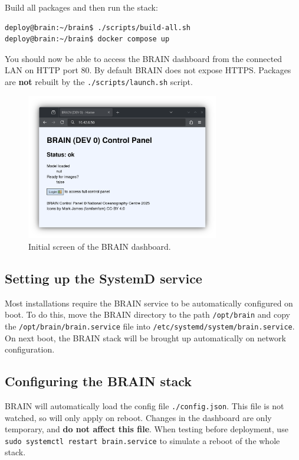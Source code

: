 \documentclass[11pt]{article}
\begin{document}
Build all packages and then run the stack:

\lstset{style=console}
\begin{lstlisting}
deploy@brain:~/brain$ ./scripts/build-all.sh
deploy@brain:~/brain$ docker compose up
\end{lstlisting}

You should now be able to access the BRAIN dashboard from the connected LAN on HTTP port 80. By default BRAIN does not expose HTTPS. Packages are \textbf{not} rebuilt by the \texttt{./scripts/launch.sh} script.

\begin{figure}[h!]
\centering
\includegraphics[width=0.75\textwidth]{brain-cpanel}
\caption{Initial screen of the BRAIN dashboard.}
\end{figure}

\subsection{Setting up the SystemD service}

Most installations require the BRAIN service to be automatically configured on boot. To do this, move the BRAIN directory to the path \texttt{/opt/brain} and copy the \texttt{/opt/brain/brain.service} file into \texttt{/etc/systemd/system/brain.service}. On next boot, the BRAIN stack will be brought up automatically on network configuration.

\newpage

\subsection{Configuring the BRAIN stack}

BRAIN will automatically load the config file \texttt{./config.json}. This file is not watched, so will only apply on reboot. Changes in the dashboard are only temporary, and \textbf{do not affect this file}. When testing before deployment, use \texttt{sudo systemctl restart brain.service} to simulate a reboot of the whole stack.
\end{document}
